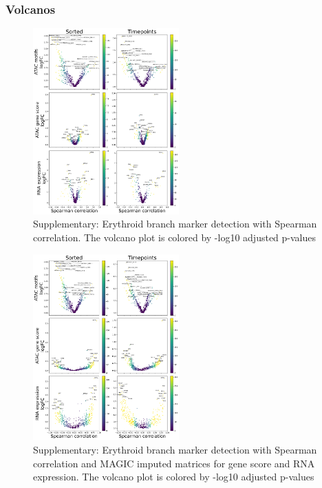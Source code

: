\documentclass[a4paper]{article}
\begin{document}
\FloatBarrier
\subsubsection{Volcanos}

\begin{figure}[!htb]
  \centering
  \includegraphics[width=0.5\textwidth]{../figures/hematopoiesis/MKP_40_110_smooth_none_single_branch_volcanos_motifs.png}
  \caption{Supplementary: Erythroid branch marker detection with Spearman correlation. The volcano plot is colored by -log10 adjusted p-values}
\end{figure}


\begin{figure}[!htb]
  \centering
  \includegraphics[width=0.5\textwidth]{../figures/hematopoiesis/MKP_40_110_smooth_magic_single_branch_volcanos_motifs.png}
  \caption{Supplementary: Erythroid branch marker detection with Spearman correlation and MAGIC imputed matrices for gene score and RNA expression. The volcano plot is colored by -log10 adjusted p-values}
\end{figure}
\end{document}
